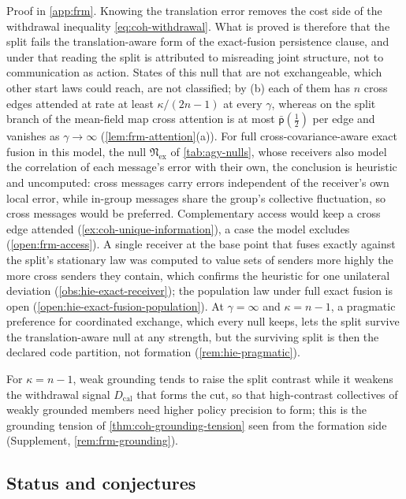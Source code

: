 Proof in \cref{app:frm}. Knowing the translation error removes the cost side of the withdrawal inequality \eqref{eq:coh-withdrawal}. What is proved is therefore that the split fails the translation-aware form of the exact-fusion persistence clause, and under that reading the split is attributed to misreading joint structure, not to communication as action. States of this null that are not exchangeable, which other start laws could reach, are not classified; by (b) each of them has $n$ cross edges attended at rate at least $\kappa/(2n-1)$ at every $\gamma$, whereas on the split branch of the mean-field map cross attention is at most $\bar{\mathsf p}(\frac12)$ per edge and vanishes as $\gamma\to\infty$ (\cref{lem:frm-attention}(a)). For full cross-covariance-aware exact fusion in this model, the null $\mathfrak N_{\mathrm{ex}}$ of \cref{tab:agy-nulls}, whose receivers also model the correlation of each message's error with their own, the conclusion is heuristic and uncomputed: cross messages carry errors independent of the receiver's own local error, while in-group messages share the group's collective fluctuation, so cross messages would be preferred. Complementary access would keep a cross edge attended (\cref{ex:coh-unique-information}), a case the model excludes (\cref{open:frm-access}). A single receiver at the base point that fuses exactly against the split's stationary law was computed to value sets of senders more highly the more cross senders they contain, which confirms the heuristic for one unilateral deviation (\cref{obs:hie-exact-receiver}); the population law under full exact fusion is open (\cref{open:hie-exact-fusion-population}). At $\gamma=\infty$ and $\kappa=n-1$, a pragmatic preference for coordinated exchange, which every null keeps, lets the split survive the translation-aware null at any strength, but the surviving split is then the declared code partition, not formation (\cref{rem:hie-pragmatic}).

For $\kappa=n-1$, weak grounding tends to raise the split contrast while it weakens the withdrawal signal $D_{\mathrm{cal}}$ that forms the cut, so that high-contrast collectives of weakly grounded members need higher policy precision to form; this is the grounding tension of \cref{thm:coh-grounding-tension} seen from the formation side (Supplement, \cref{rem:frm-grounding}).

\subsection{Status and conjectures}\label{sec:frm-status}


